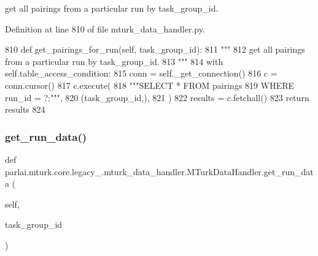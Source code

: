 \begin{DoxyVerb}get all pairings from a particular run by task_group_id.
\end{DoxyVerb}
 

Definition at line 810 of file mturk\+\_\+data\+\_\+handler.\+py.


\begin{DoxyCode}
810     \textcolor{keyword}{def }get\_pairings\_for\_run(self, task\_group\_id):
811         \textcolor{stringliteral}{"""}
812 \textcolor{stringliteral}{        get all pairings from a particular run by task\_group\_id.}
813 \textcolor{stringliteral}{        """}
814         with self.table\_access\_condition:
815             conn = self.\_get\_connection()
816             c = conn.cursor()
817             c.execute(
818                 \textcolor{stringliteral}{"""SELECT * FROM pairings}
819 \textcolor{stringliteral}{                         WHERE run\_id = ?;"""},
820                 (task\_group\_id,),
821             )
822             results = c.fetchall()
823             \textcolor{keywordflow}{return} results
824 
\end{DoxyCode}
\mbox{\label{classparlai_1_1mturk_1_1core_1_1legacy__2018_1_1mturk__data__handler_1_1MTurkDataHandler_a9f03e4f7a133dfa1d22df886a303d339}} 
\subsubsection{\texorpdfstring{get\+\_\+run\+\_\+data()}{get\_run\_data()}}
{\footnotesize\ttfamily def parlai.\+mturk.\+core.\+legacy\+\_.\+mturk\+\_\+data\+\_\+handler.\+M\+Turk\+Data\+Handler.\+get\+\_\+run\+\_\+data (\begin{DoxyParamCaption}\item[{}]{self,  }\item[{}]{task\+\_\+group\+\_\+id }\end{DoxyParamCaption})}

